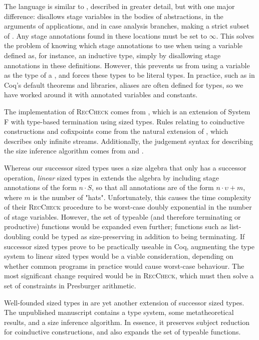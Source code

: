 \documentclass[nonacm,screen,10pt]{acmart}
\begin{document}
The language \CIChatbar \cite{cic-hat-bar} is similar to \CIChat, described in greater detail, but with one major difference: \CIChatbar disallows stage variables in the bodies of abstractions, in the arguments of applications, and in case analysis branches, making \CIChatbar a strict subset of \CIChat. Any stage annotations found in these locations must be set to $\infty$. This solves the problem of knowing which stage annotations to use when using a variable defined as, for instance, an inductive type, simply by disallowing stage annotations in these definitions. However, this prevents us from using a variable as the \corecursive type of a \cofixpoint, and forces these types to be literal \coinductive types. In practice, such as in Coq's default theorems and libraries, aliases are often defined for \coinductive types, so we have worked around it with annotated variables and constants.

The implementation of \textsc{RecCheck} comes from \Fhat \cite{f-hat}, which is an extension of System F with type-based termination using sized types. Rules relating to coinductive constructions and cofixpoints come from the natural extension of \CChatomega \cite{cc-hat-omega}, which describes only infinite streams. Additionally, the judgement syntax for describing the size inference algorithm comes from \CChatomega and \CIChatl \cite{cic-hat-l}.

Whereas our successor sized types uses a size algebra that only has a successor operation, \textit{linear} sized types in \CIChatl extends the algebra by including stage annotations of the form $n \cdot S$, so that all annotations are of the form $n \cdot \upsilon + m$, where $m$ is the number of "hats". Unfortunately, this causes the time complexity of their \textsc{RecCheck} procedure to be worst-case doubly exponential in the number of stage variables. However, the set of typeable (and therefore terminating or productive) functions would be expanded even further; functions such as list-doubling could be typed as size-preserving in addition to being terminating. If successor sized types prove to be practically useable in Coq, augmenting the type system to linear sized types would be a viable consideration, depending on whether common programs in practice would cause worst-case behaviour. The most significant change required would be in \textsc{RecCheck}, which must then solve a set of constraints in Presburger arithmetic.

Well-founded sized types in \CIChatsub \cite{wellfounded} are yet another extension of successor sized types. The unpublished manuscript contains a type system, some metatheoretical results, and a size inference algorithm. In essence, it preserves subject reduction for coinductive constructions, and also expands the set of typeable functions.
\end{document}
